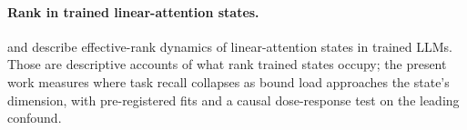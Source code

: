 \paragraph{Rank in trained linear-attention states.}
\citet{nazari2026rank} and \citet{sun2026staterank} describe effective-rank
dynamics of linear-attention states in trained LLMs. Those are
descriptive accounts of what rank trained states occupy; the present
work measures where task recall collapses as bound load approaches the
state's dimension, with pre-registered fits and a causal dose-response
test on the leading confound.
